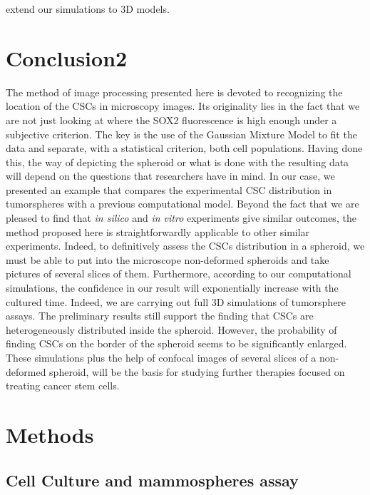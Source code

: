 \documentclass[fleqn,10pt]{wlscirep}
\begin{document}
extend our simulations to 3D models.
             
\section*{Conclusion2}

The method of image processing presented here is devoted to recognizing the location of the CSCs in microscopy images. Its originality lies in the fact that we are not just looking at where the SOX2 fluorescence is high enough under a subjective criterion. The key is the use of the Gaussian Mixture Model to fit the data and separate, with a statistical criterion, both cell populations. Having done this, the way of depicting the spheroid or what is done with the resulting data will depend on the questions that researchers have in mind. In our case, we presented an example that compares the experimental CSC distribution in tumorspheres with a previous computational model. Beyond the fact that we are pleased to find that \emph{in silico} and \emph{in vitro} experiments give similar outcomes, the method proposed here is straightforwardly applicable to other similar experiments. Indeed, to definitively assess the CSCs distribution in a spheroid, we must be able to put into the microscope non-deformed spheroids and take pictures of several slices of them.
Furthermore, according to our computational simulations, the confidence in our result will exponentially increase with the cultured time. Indeed, we are carrying out full 3D simulations of tumorsphere assays. The preliminary results still support the finding that CSCs are heterogeneously distributed inside the spheroid. However, the probability of finding CSCs on the border of the spheroid seems to be significantly enlarged. These simulations plus the help of confocal images of several slices of a non-deformed spheroid, will be the basis for studying further therapies focused on treating cancer stem cells.    



\section*{Methods} \label{s: methods}


\subsection*{Cell Culture and mammospheres assay}
\end{document}
